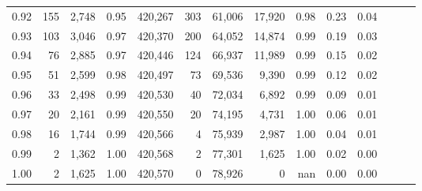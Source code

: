 \begin{tabular}{rrrrrrrrrrrrrr}
0.92 &    155 &  2,748 &  0.95 &  420,267 &      303 &  61,006 &  17,920 &  0.98 &  0.23 &      0.04 \\
0.93 &    103 &  3,046 &  0.97 &  420,370 &      200 &  64,052 &  14,874 &  0.99 &  0.19 &      0.03 \\
0.94 &     76 &  2,885 &  0.97 &  420,446 &      124 &  66,937 &  11,989 &  0.99 &  0.15 &      0.02 \\
0.95 &     51 &  2,599 &  0.98 &  420,497 &       73 &  69,536 &   9,390 &  0.99 &  0.12 &      0.02 \\
0.96 &     33 &  2,498 &  0.99 &  420,530 &       40 &  72,034 &   6,892 &  0.99 &  0.09 &      0.01 \\
0.97 &     20 &  2,161 &  0.99 &  420,550 &       20 &  74,195 &   4,731 &  1.00 &  0.06 &      0.01 \\
0.98 &     16 &  1,744 &  0.99 &  420,566 &        4 &  75,939 &   2,987 &  1.00 &  0.04 &      0.01 \\
0.99 &      2 &  1,362 &  1.00 &  420,568 &        2 &  77,301 &   1,625 &  1.00 &  0.02 &      0.00 \\
1.00 &      2 &  1,625 &  1.00 &  420,570 &        0 &  78,926 &       0 &   nan &  0.00 &      0.00 \\
\bottomrule
\end{tabular}
